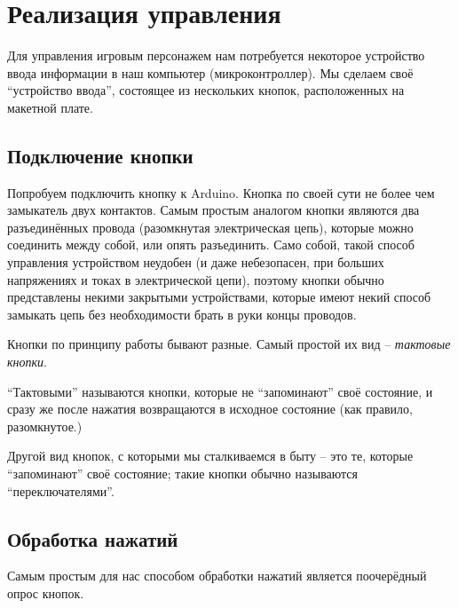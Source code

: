 \documentclass[../sparc.tex]{subfiles}
\begin{document}
\section{Реализация управления}

Для управления игровым персонажем нам потребуется некоторое устройство ввода
информации в наш компьютер (микроконтроллер).  Мы сделаем своё ``устройство
ввода'', состоящее из нескольких кнопок, расположенных на макетной плате.

\subsection{Подключение кнопки}

Попробуем подключить кнопку к Arduino.  Кнопка по своей сути не более чем
замыкатель двух контактов.  Самым простым аналогом кнопки являются два
разъединённых провода (разомкнутая электрическая цепь), которые можно соединить
между собой, или опять разъединить.  Само собой, такой способ управления
устройством неудобен (и даже небезопасен, при больших напряжениях и токах в
электрической цепи), поэтому кнопки обычно представлены некими закрытыми
устройствами, которые имеют некий способ замыкать цепь без необходимости брать в
руки концы проводов.

Кнопки по принципу работы бывают разные.  Самый простой их вид -- \emph{тактовые
кнопки}.

``Тактовыми'' называются кнопки, которые не ``запоминают'' своё состояние, и
сразу же после нажатия возвращаются в исходное состояние (как правило,
разомкнутое.)

Другой вид кнопок, с которыми мы сталкиваемся в быту -- это те, которые
``запоминают'' своё состояние; такие кнопки обычно называются
``переключателями''.


\subsection{Обработка нажатий}

Самым простым для нас способом обработки нажатий является поочерёдный опрос
кнопок.
\end{document}
